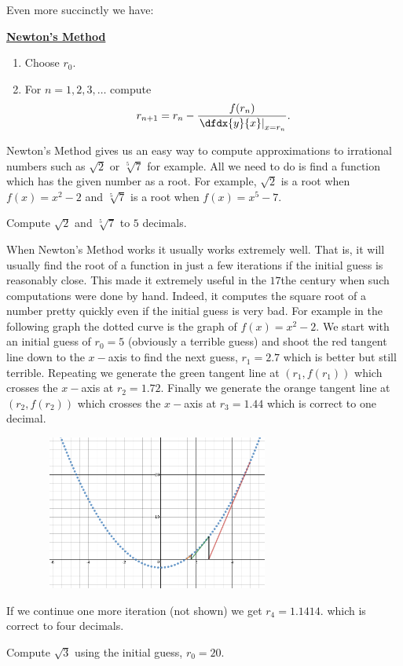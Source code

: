 Even more succinctly we have:\\
\centerline{\bf \Large \underline{Newton's Method}}
\begin{enumerate}
\item Choose $r_0.$
\item For $n=1, 2, 3, \ldots$ compute
$$
r_{n+1}=r_n-\frac{f(r_n)}{\left.\dfdx{y}{x}\right|_{x=r_n}}.
$$
\end{enumerate}

\begin{myexample}
  Newton's Method gives us an easy way to compute approximations to
  irrational numbers such as $\sqrt{2}$ or $\sqrt[5]{7}$ for
  example. All we need to do is find a function which has the given
  number as a root. For example, $\sqrt{2}$ is a root when $f(x) =
  x^2-2$ and $\sqrt[5]{7}$ is a root when $f(x) = x^5-7.$
\end{myexample}
\begin{embeddedproblem}
  Compute $\sqrt{2}$ and $\sqrt[5]{7}$ to $5$ decimals.
\end{embeddedproblem}

When Newton's Method works it usually works extremely well. That is,
it will usually find the root of a function in just a few iterations
if the initial guess is reasonably close. This made it extremely
useful in the $17$the century when such computations were done by
hand. Indeed, it computes the
square root of a number pretty quickly even if the initial guess is
very bad. For example in the following graph the dotted curve is the
graph of $f(x)=x^2-2.$ We start with an initial guess of $r_0=5$
(obviously a terrible guess) and
shoot the red tangent line down to the $x-$axis to find the next
guess, $r_1=2.7$ which is better but still terrible. Repeating we
generate the green tangent line at $(r_1,f(r_1))$ which crosses the
$x-$axis at $r_2= 1.72.$ Finally we generate the orange tangent line
at $(r_2,f(r_2))$ which crosses the $x-$axis at $r_3=1.44$ which is
correct to one decimal.
\centerline{\includegraphics*[height=2in,width=4in]{Figures/NewtonsMethod1}}
If we continue one more iteration (not shown) we get $r_4=1.1414.$
which is correct to four decimals. 
\begin{embeddedproblem}{}
  Compute $\sqrt{3}$ using the initial guess, $r_0=20.$
\end{embeddedproblem}

